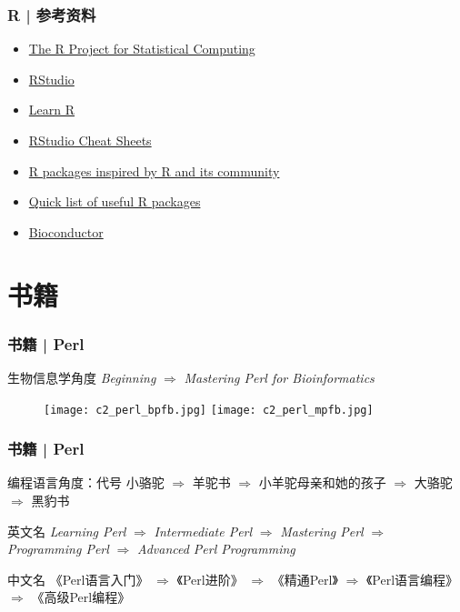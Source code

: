 \begin{frame}
  \frametitle{R | 参考资料}
   \begin{itemize}
     \item \href{https://www.r-project.org/}{The R Project for Statistical Computing}
     \item \href{https://www.rstudio.com/}{RStudio}
     \item \href{https://support.rstudio.com/hc/en-us/categories/200098757-Learn-R}{Learn R}
     \item \href{https://www.rstudio.com/resources/cheatsheets/}{RStudio Cheat Sheets}
     \item \href{https://www.rstudio.com/products/rpackages/}{R packages inspired by R and its community}
     \item \href{https://support.rstudio.com/hc/en-us/articles/201057987-Quick-list-of-useful-R-packages}{Quick list of useful R packages}
     \item \href{https://www.bioconductor.org/}{Bioconductor}
   \end{itemize}
\end{frame}

\section{书籍}
\begin{frame}
  \frametitle{书籍 | Perl}
  \begin{block}{生物信息学角度}
    \textit{\alert{Beginning}} $\Longrightarrow$ \textit{Mastering Perl for Bioinformatics}
  \end{block}
  \begin{figure}
    \centering
    \texttt{[image: c2\_perl\_bpfb.jpg]}
    \hspace{1em}
    \texttt{[image: c2\_perl\_mpfb.jpg]}
  \end{figure}
\end{frame}

\begin{frame}
  \frametitle{书籍 | Perl}
  \begin{block}{编程语言角度：代号}
小骆驼 $\Rightarrow$ 羊驼书 $\Rightarrow$ 小羊驼母亲和她的孩子 $\Rightarrow$ 大骆驼 $\Rightarrow$ 黑豹书
  \end{block}
  \pause
  \begin{block}{英文名}
    \textit{Learning Perl} $\Rightarrow$ \textit{Intermediate Perl} $\Rightarrow$ \textit{Mastering Perl} $\Rightarrow$ \textit{Programming Perl} $\Rightarrow$ \textit{Advanced Perl Programming}
  \end{block}
  \pause
  \begin{block}{中文名}
    \alert{《Perl语言入门》} $\Rightarrow$ 《Perl进阶》 $\Rightarrow$ 《精通Perl》 $\Rightarrow$ 《Perl语言编程》 $\Rightarrow$ 《高级Perl编程》
  \end{block}
  \pause
\end{frame}

